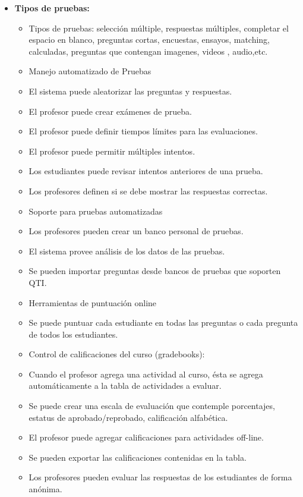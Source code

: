 	\begin{itemize}
		\item \textbf{Tipos de pruebas:}
			\begin{itemize}
				\item Tipos de pruebas: selección múltiple, respuestas múltiples, completar el espacio en blanco,  preguntas cortas, encuestas, ensayos, matching, calculadas, preguntas que contengan imagenes, videos , audio,etc.
				\item Manejo automatizado de Pruebas
				\item El sistema puede aleatorizar las preguntas  y respuestas.
				\item El profesor puede crear exámenes de prueba.
				\item El profesor puede definir tiempos límites para las evaluaciones.
				\item El profesor puede permitir múltiples intentos.
				\item Los estudiantes puede revisar intentos anteriores de una prueba.
				\item Los profesores definen si se debe mostrar las respuestas correctas.
				\item Soporte para pruebas automatizadas
				\item Los profesores pueden crear un banco personal de pruebas.
				\item El sistema provee análisis de los datos de las pruebas.
				\item Se pueden importar preguntas desde bancos de pruebas que soporten QTI.
				\item Herramientas de puntuación online
				\item Se puede puntuar cada estudiante en todas las preguntas o cada pregunta de todos los estudiantes.
				\item Control de calificaciones del curso (gradebooks):
				\item Cuando el profesor agrega una actividad al curso, ésta se agrega automáticamente a la tabla de actividades a evaluar.
				\item Se puede crear una escala de evaluación que contemple porcentajes, estatus de aprobado/reprobado, calificación alfabética.
				\item El profesor puede agregar calificaciones para actividades off-line.
				\item Se pueden exportar las calificaciones contenidas en la tabla.
				\item Los profesores pueden evaluar las respuestas de los estudiantes de forma anónima.
			\end{itemize}
	\end{itemize}

